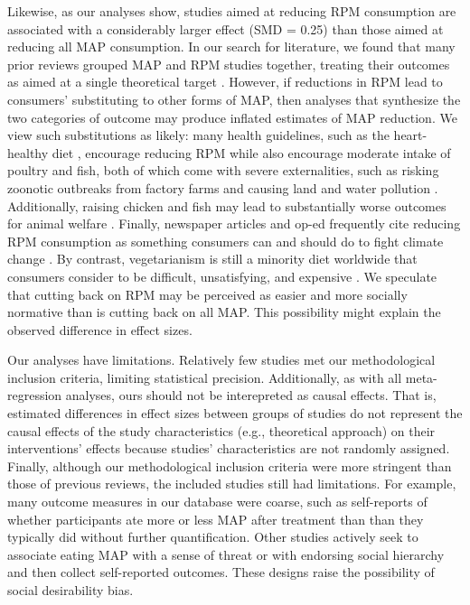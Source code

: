 \documentclass[sn-nature,referee,pdflatex]{sn-jnl}
\begin{document}
Likewise, as our analyses show, studies aimed at reducing RPM
consumption are associated with a considerably larger effect (SMD =
0.25) than those aimed at reducing all MAP consumption. In our search
for literature, we found that many prior reviews grouped MAP and RPM
studies together, treating their outcomes as aimed at a single
theoretical target \citep{slough2023}. However, if reductions in RPM
lead to consumers' substituting to other forms of MAP, then analyses
that synthesize the two categories of outcome may produce inflated
estimates of MAP reduction. We view such substitutions as likely: many
health guidelines, such as the heart-healthy diet \citep{diab2023},
encourage reducing RPM while also encourage moderate intake of poultry
and fish, both of which come with severe externalities, such as risking
zoonotic outbreaks from factory farms \citep{hafez2020} and causing land
and water pollution \citep{grvzinic2023}. Additionally, raising chicken
and fish may lead to substantially worse outcomes for animal welfare
\citep{mathur2022ethical}. Finally, newspaper articles and op-ed
frequently cite reducing RPM consumption as something consumers can and
should do to fight climate change \citep{moskin2022, carroll2019}. By
contrast, vegetarianism is still a minority diet worldwide
\citep{tilman2014} that consumers consider to be difficult,
unsatisfying, and expensive \citep{bryant2019}. We speculate that
cutting back on RPM may be perceived as easier and more socially
normative than is cutting back on all MAP. This possibility might
explain the observed difference in effect sizes.

Our analyses have limitations. Relatively few studies met our
methodological inclusion criteria, limiting statistical precision.
Additionally, as with all meta-regression analyses, ours should not be
interepreted as causal effects. That is, estimated differences in effect
sizes between groups of studies do not represent the causal effects of
the study characteristics (e.g., theoretical approach) on their
interventions' effects because studies' characteristics are not randomly
assigned. Finally, although our methodological inclusion criteria were
more stringent than those of previous reviews, the included studies
still had limitations. For example, many outcome measures in our
database were coarse, such as self-reports of whether participants ate
more or less MAP after treatment than than they typically did
\citep{aberman2018} without further quantification. Other studies
actively seek to associate eating MAP with a sense of threat
\citep{fehrenbach2015} or with endorsing social hierarchy
\citep{allen2002} and then collect self-reported outcomes. These designs
raise the possibility of social desirability bias.
\end{document}
